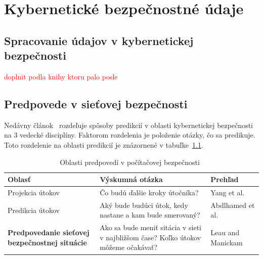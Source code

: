 \documentclass[thesismargins, thesislinespacing, openright, upjsfrontpage, combineabstracts]{rnthesis}
\begin{document}


% 
\chapter{Kybernetické bezpečnostné údaje}

\section{Spracovanie údajov v kybernetickej bezpečnosti}

\textcolor{red}{doplnit podla knihy ktoru palo posle}

\section{Predpovede v sieťovej bezpečnosti} \label{discipliny}

Nedávny článok~\cite{Husak2018survey} rozdeľuje spôsoby predikcií v oblasti kybernetickej bezpečnosti na 3 vedecké disciplíny. Faktorom rozdelenia je položenie otázky, čo sa predikuje. Toto rozdelenie na oblasti predikcií je znázornené v tabuľke~\ref{Tab:husak}.

\begin{table}
\begin{center}
\begin{tabular}{ | p{4cm} | p{6cm} | p{3cm} | }
\hline
\textbf{Oblasť} & \textbf{Výskumná otázka} & \textbf{Prehľad} \\
\hline
\hline Projekcia útokov & Čo budú ďalšie kroky útočníka? & Yang et al.~\cite{Yang2014} \\
\hline Predikcia útokov & Aký bude budúci útok, kedy nastane a kam bude smerovaný? & Abdlhamed et al.~\cite{Abdlhamed2017} \\
\hline \textbf{Predpovedanie sieťovej bezpečnostnej situácie} & Ako sa bude meniť sitácia v sieti v najbližšom čase? Koľko útokov môžeme očakávať? & Leau and  Manickam~\cite{Leau2015} \\
\hline
\end{tabular}
\end{center}
\label{Tab:husak}
\caption{Oblasti predpovedí v počítačovej bezpečnosti~\cite{Husak2018survey}}
\end{table}
\end{document}
